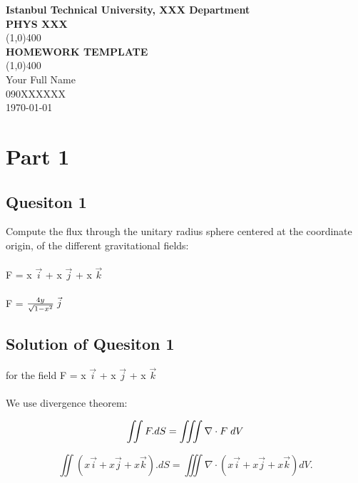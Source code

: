 \documentclass[11pt]{article}
\begin{document}
\begin{titlepage}
\begin{center}
\vspace*{1cm}
\Large{\textbf{Istanbul Technical University, XXX Department}}\\
\Large{\textbf{PHYS XXX}}\\
\vfill
\line(1,0){400}\\[1mm]
\huge{\textbf{HOMEWORK TEMPLATE}}\\[3mm]

\line(1,0){400}\\
\vfill
Your Full Name \\
090XXXXXX\\
\today\\
\end{center}
\end{titlepage}


\section*{Part 1}

\subsection*{Quesiton 1}

Compute the flux through the unitary radius sphere centered at the
coordinate origin, of the different gravitational fields:\\\\
F = x $\vec{i}$ + x $\vec{j}$ + x $\vec{k}$\\\\
F = $\frac{4y}{\sqrt{1-x^{2}}} \hspace{0.1cm} \vec{j}$

\subsection*{Solution of Quesiton 1}


for the field  F = x $\vec{i}$ + x $\vec{j}$ + x $\vec{k}$\\\\

We use divergence theorem: 

$$\iint F.dS = \iiint \nabla \cdot F \hspace{0.1cm} dV $$

$$\iint (x \vec{i} + x \vec{j} + x \vec{k}).dS = \iiint \nabla \cdot (x \vec{i} + x \vec{j} + x \vec{k})  dV . $$
\end{document}
